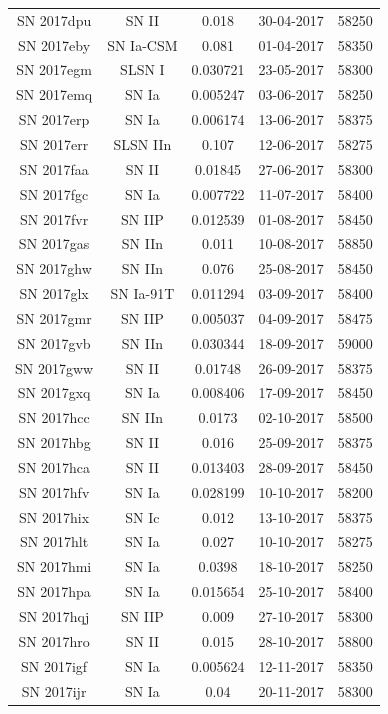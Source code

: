 \documentclass[a4paper,oneside,12pt, class=Latex/Classes/PhDthesisPSnPDF, crop=false]{standalone}
\begin{document}
\begin{longtable}{ccccc}
 SN 2017dpu & SN II & 0.018 & 30-04-2017 & 58250 \\
 SN 2017eby & SN Ia-CSM & 0.081 & 01-04-2017 & 58350 \\
 SN 2017egm & SLSN I & 0.030721 & 23-05-2017 & 58300 \\
 SN 2017emq & SN Ia & 0.005247 & 03-06-2017 & 58250 \\
 SN 2017erp & SN Ia & 0.006174 & 13-06-2017 & 58375 \\
 SN 2017err & SLSN IIn & 0.107 & 12-06-2017 & 58275 \\
 SN 2017faa & SN II & 0.01845 & 27-06-2017 & 58300 \\
 SN 2017fgc & SN Ia & 0.007722 & 11-07-2017 & 58400 \\
 SN 2017fvr & SN IIP & 0.012539 & 01-08-2017 & 58450 \\
 SN 2017gas & SN IIn & 0.011 & 10-08-2017 & 58850 \\
 SN 2017ghw & SN IIn & 0.076 & 25-08-2017 & 58450 \\
 SN 2017glx & SN Ia-91T & 0.011294 & 03-09-2017 & 58400 \\
 SN 2017gmr & SN IIP & 0.005037 & 04-09-2017 & 58475 \\
 SN 2017gvb & SN IIn & 0.030344 & 18-09-2017 & 59000 \\
 SN 2017gww & SN II & 0.01748 & 26-09-2017 & 58375 \\
 SN 2017gxq & SN Ia & 0.008406 & 17-09-2017 & 58450 \\
 SN 2017hcc & SN IIn & 0.0173 & 02-10-2017 & 58500 \\
 SN 2017hbg & SN II & 0.016 & 25-09-2017 &  58375\\
 SN 2017hca & SN II & 0.013403 & 28-09-2017 & 58450 \\
 SN 2017hfv & SN Ia & 0.028199 & 10-10-2017 & 58200 \\
 SN 2017hix & SN Ic & 0.012 & 13-10-2017 & 58375 \\
 SN 2017hlt & SN Ia & 0.027 & 10-10-2017 & 58275 \\
 SN 2017hmi & SN Ia & 0.0398 & 18-10-2017 & 58250 \\
 SN 2017hpa & SN Ia & 0.015654 & 25-10-2017 & 58400 \\
 SN 2017hqj & SN IIP & 0.009 & 27-10-2017 & 58300 \\
 SN 2017hro & SN II & 0.015 & 28-10-2017 & 58800 \\
 SN 2017igf & SN Ia & 0.005624 & 12-11-2017 & 58350 \\
 SN 2017ijr & SN Ia & 0.04 & 20-11-2017 & 58300 \\

\end{longtable}
\end{document}
